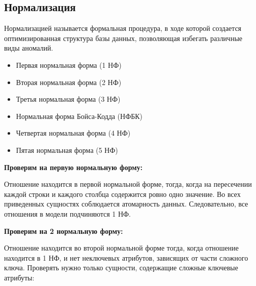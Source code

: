 \subsection {Нормализация}
Нормализацией называется формальная процедура, в ходе которой создается оптимизированная структура базы данных, позволяющая избегать различные виды аномалий.

\begin{itemize}
    \item Первая нормальная форма (1 НФ)
    \item Вторая нормальная форма (2 НФ)
    \item Третья нормальная форма (3 НФ)
    \item Нормальная форма Бойса-Кодда (НФБК)
    \item Четвертая нормальная форма (4 НФ)
    \item Пятая нормальная форма (5 НФ)
\end{itemize}

{\bf Проверим на первую нормальную форму:}

Отношение находится в первой нормальной форме, тогда, когда на пересечении каждой строки и каждого столбца содержится ровно одно значение.
Во всех приведенных сущностях соблюдается атомарность данных.
Следовательно, все отношения в модели подчиняются 1 НФ.

{\bf Проверим на 2 нормальную форму:}

Отношение находится во второй нормальной форме тогда, когда отношение находится в 1 НФ, и нет неключевых атрибутов, зависящих от части сложного ключа.
Проверять нужно только сущности, содержащие сложные ключевые атрибуты:

